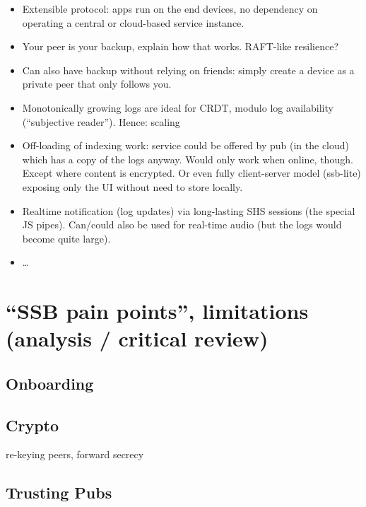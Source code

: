\documentclass[sigconf]{acmart}
\begin{document}
\begin{itemize}

\item Extensible protocol: apps run on the end devices, no dependency
  on operating a central or cloud-based service instance.

\item Your peer is your backup, explain how that works. RAFT-like resilience?

\item Can also have backup without relying on friends: simply create a
  device as a private peer that only follows you.

\item Monotonically growing logs are ideal for CRDT, modulo log
  availability (``subjective reader''). Hence: scaling

\item Off-loading of indexing work: service could be offered by pub
  (in the cloud) which has a copy of the logs anyway. Would only work
  when online, though. Except where content is encrypted. Or even
  fully client-server model (ssb-lite) exposing only the UI without
  need to store locally.

\item Realtime notification (log updates) via long-lasting SHS
  sessions (the special JS pipes). Can/could also be used for
  real-time audio (but the logs would become quite large).

\item \ldots

\end{itemize}


\section{``SSB pain points'', limitations (analysis / critical review)}

\subsection{Onboarding}

\subsection{Crypto}

re-keying peers, forward secrecy

\subsection{Trusting Pubs}
\end{document}

